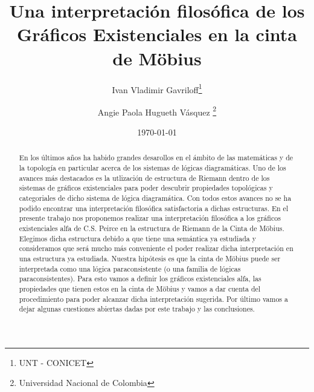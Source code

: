 \documentclass[
	fontsize=10pt, %
	twoside=false, %
	secnumdepth=1, %
	abstract=true, %
]{kaohandt}
\begin{document}

\title[Una interpretación filosófica de los Gráficos Existenciales en la cinta de Möbius]{Una interpretación filosófica de los Gráficos Existenciales en la cinta de Möbius}

\author[IVG, APHV]{Ivan Vladimir Gavriloff\thanks{UNT - CONICET} \and Angie Paola Hugueth Vásquez \thanks{Universidad Nacional de Colombia}}

\date{\today}


\maketitle

\margintoc

\begin{abstract}
	\noindent
	En los últimos años ha habido grandes desarollos en el ámbito de las matemáticas y de la topología en particular acerca de los sistemas de lógicas diagramáticas. Uno de los avances más destacados es la utlización de estructura de Riemann dentro de los sistemas de gráficos existenciales para poder descubrir propiedades topológicas y categoriales de dicho sistema de lógica diagramática. Con todos estos avances no se ha podido encontrar una interpretación filosófica satisfactoria a dichas estructuras.
	En el presente trabajo nos proponemos realizar una interpretación filosófica a los gráficos existenciales alfa de C.S. Peirce en la estructura de Riemann de la Cinta de Möbius. Elegimos dicha estructura debido a que tiene una semántica ya estudiada y consideramos que será mucho más conveniente el poder realizar dicha interpretación en una estructura ya estudiada. Nuestra hipótesis es que la cinta de Möbius puede ser interpretada como una lógica paraconsistente (o una familia de lógicas paraconsistentes). Para esto vamos a definir los gráficos existenciales alfa, las propiedades que tienen estos en la cinta de Möbius y vamos a dar cuenta del procedimiento para poder alcanzar dicha interpretación sugerida. Por último vamos a dejar algunas cuestiones abiertas dadas por este trabajo y las conclusiones.
\end{abstract}
\end{document}
